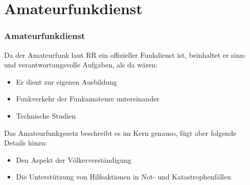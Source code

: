 
\section{Amateurfunkdienst}
\label{section:amateurfunkdienst}
\begin{frame}%

\frametitle{Amateurfunkdienst}
Da der Amateurfunk laut RR ein offizieller Funkdienst ist, beinhaltet er sinn- und verantwortungsvolle Aufgaben, als da wären:

\begin{itemize}
  \item Er dient zur eigenen Ausbildung
  \item Funkverkehr der Funkamateure untereinander
  \item Technische Studien
  \end{itemize}
\end{frame}

\begin{frame}Das Amateurfunkgesetz beschreibt es im Kern genauso, fügt aber folgende Details hinzu:

\begin{itemize}
  \item Den Aspekt der Völkerverständigung
  \item Die Unterstützung von Hilfsaktionen in Not- und Katastrophenfällen
  \end{itemize}

\end{frame}

\begin{frame}
\end{frame}

